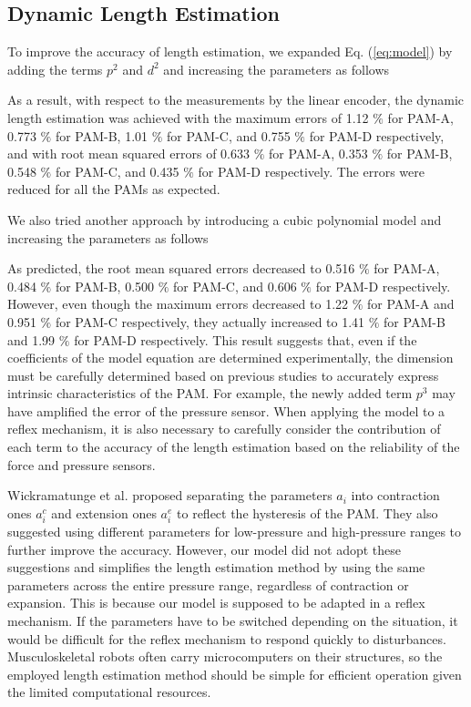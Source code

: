 \renewcommand{\thesubsection}{\Alph{subsection}}
\setcounter{subsection}{1} 
\subsection{Dynamic Length Estimation}
To improve the accuracy of length estimation, we expanded Eq. (\ref{eq:model}) by adding the terms $p^2$ and $d^2$ and increasing the parameters as follows

As a result, with respect to the measurements by the linear encoder, the dynamic length estimation was achieved with the maximum errors of 1.12 $\%$ for PAM-A, 0.773 $\%$ for PAM-B, 1.01 $\%$ for PAM-C, and 0.755 $\%$ for PAM-D respectively, and with root mean squared errors of 0.633 $\%$ for PAM-A, 0.353 $\%$ for PAM-B, 0.548 $\%$ for PAM-C, and 0.435 $\%$ for PAM-D respectively. The errors were reduced for all the PAMs as expected. 

We also tried another approach by introducing a cubic polynomial model and increasing the parameters as follows

As predicted, the root mean squared errors decreased to 0.516 $\%$ for PAM-A, 0.484 $\%$ for PAM-B, 0.500 $\%$ for PAM-C, and 0.606 $\%$ for PAM-D respectively. 
However, even though the maximum errors decreased to 1.22 $\%$ for PAM-A and 0.951 $\%$ for PAM-C respectively, they actually increased to 1.41 $\%$ for PAM-B and 1.99 $\%$ for PAM-D respectively. This result suggests that, even if the coefficients of the model equation are determined experimentally, the dimension must be carefully determined based on previous studies to accurately express intrinsic characteristics of the PAM. For example, the newly added term $p^3$ may have amplified the error of the pressure sensor. When applying the model to a reflex mechanism, it is also necessary to carefully consider the contribution of each term to the accuracy of the length estimation based on the reliability of the force and pressure sensors.

Wickramatunge et al. proposed separating the parameters $a_i$ into contraction ones $a^c_i$ and extension ones $a^e_i$ to reflect the hysteresis of the PAM\cite{spring}. They also suggested using different parameters for low-pressure and high-pressure ranges to further improve the accuracy. However, our model did not adopt these suggestions and simplifies the length estimation method by using the same parameters across the entire pressure range, regardless of contraction or expansion. This is because our model is supposed to be adapted in a reflex mechanism. If the parameters have to be switched depending on the situation, it would be difficult for the reflex mechanism to respond quickly to disturbances. Musculoskeletal robots often carry microcomputers on their structures, so the employed length estimation method should be simple for efficient operation given the limited computational resources.

